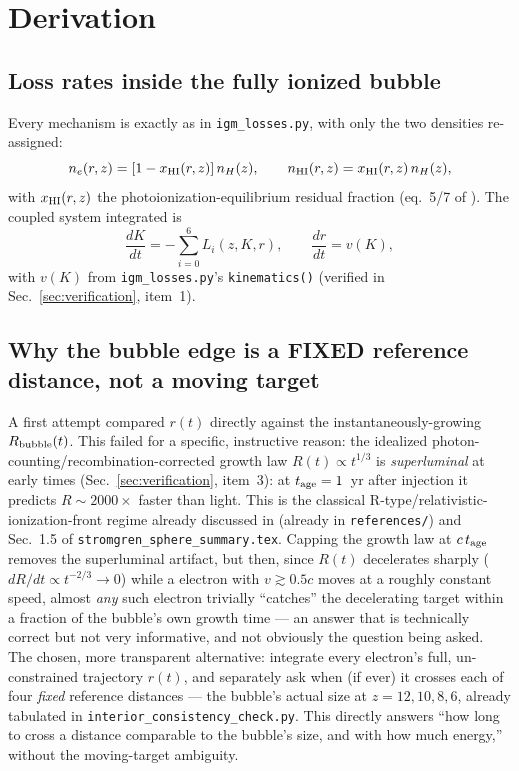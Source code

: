 \documentclass[11pt,a4paper]{article}
\begin{document}
\section{Derivation}
\label{sec:derivation}

\subsection{Loss rates inside the fully ionized bubble}
Every mechanism is exactly as in \texttt{igm\_losses.py}, with only the two densities re-assigned:
\begin{equation}
  n_e(r,z) = [1-x_{\rm HI}(r,z)]\,n_H(z), \qquad
  n_{\rm HI}(r,z) = x_{\rm HI}(r,z)\,n_H(z),
  \label{eq:densities}
\end{equation}
with $x_{\rm HI}(r,z)$ the photoionization-equilibrium residual fraction (eq.~5/7 of \citealt{Cen2000}).
The coupled system integrated is
\begin{equation}
  \frac{dK}{dt} = -\sum_{i=0}^{6} L_i(z,K,r), \qquad \frac{dr}{dt} = v(K),
  \label{eq:ode}
\end{equation}
with $v(K)$ from \texttt{igm\_losses.py}'s \texttt{kinematics()} (verified in
Sec.~\ref{sec:verification}, item~1).

\subsection{Why the bubble edge is a FIXED reference distance, not a moving target}
A first attempt compared $r(t)$ directly against the instantaneously-growing $R_{\rm bubble}(t)$. This
failed for a specific, instructive reason: the idealized photon-counting/recombination-corrected growth law
$R(t)\propto t^{1/3}$ is \emph{superluminal} at early times (Sec.~\ref{sec:verification}, item~3): at
$t_{\rm age}=1$~yr after injection it predicts $R\sim2000\times$ faster than light. This is the classical
R-type/relativistic-ionization-front regime already discussed in \citet{Shapiro2006} (already in
\texttt{references/}) and Sec.~1.5 of \texttt{stromgren\_sphere\_summary.tex}. Capping the growth law at
$c\,t_{\rm age}$ removes the superluminal artifact, but then, since $R(t)$ decelerates sharply
($dR/dt\propto t^{-2/3}\to0$) while a electron with $v\gtrsim0.5c$ moves at a roughly constant speed, almost
\emph{any} such electron trivially ``catches'' the decelerating target within a fraction of the bubble's own
growth time --- an answer that is technically correct but not very informative, and not obviously the
question being asked. The chosen, more transparent alternative: integrate every electron's full,
un-constrained trajectory $r(t)$, and separately ask when (if ever) it crosses each of four \emph{fixed}
reference distances --- the bubble's actual size at $z=12,10,8,6$, already tabulated in
\texttt{interior\_consistency\_check.py}. This directly answers ``how long to cross a distance comparable to
the bubble's size, and with how much energy,'' without the moving-target ambiguity.
\end{document}
